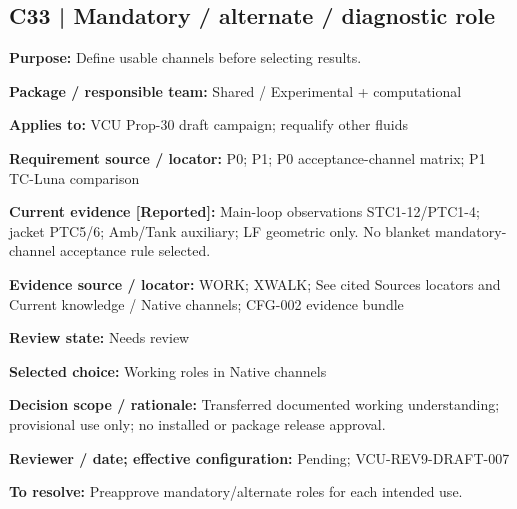 \documentclass[11pt]{article}
\begin{document}
\par\noindent\begin{minipage}{\textwidth}\small\setlength{\parskip}{2pt}
\subsection*{C33 | Mandatory / alternate / diagnostic role}
\textbf{Purpose:} Define usable channels before selecting results.\par
\textbf{Package / responsible team:} Shared / Experimental + computational\par
\textbf{Applies to:} VCU Prop-30 draft campaign; requalify other fluids\par
\textbf{Requirement source / locator:} P0; P1; P0 acceptance-channel matrix; P1 TC-Luna comparison\par
\textbf{Current evidence [Reported]:} Main-loop observations STC1-12/PTC1-4; jacket PTC5/6; Amb/Tank auxiliary; LF geometric only. No blanket mandatory-channel acceptance rule selected.\par
\textbf{Evidence source / locator:} WORK; XWALK; See cited Sources locators and Current knowledge / Native channels; CFG-002 evidence bundle\par
\textbf{Review state:} Needs review\par
\textbf{Selected choice:} Working roles in Native channels\par
\textbf{Decision scope / rationale:} Transferred documented working understanding; provisional use only; no installed or package release approval.\par
\textbf{Reviewer / date; effective configuration:} Pending; VCU-REV9-DRAFT-007\par
\textbf{To resolve:} Preapprove mandatory/alternate roles for each intended use.\par
\end{minipage}\par\vspace{5pt}
\end{document}
